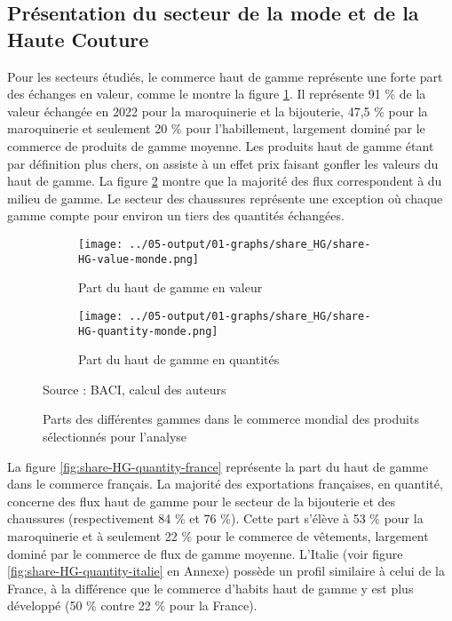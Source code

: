 \documentclass[french,10pt,a4paper]{article}
\begin{document}
\subsection{Présentation du secteur de la mode et de la Haute Couture}

Pour les secteurs étudiés, le commerce haut de gamme représente une forte part des échanges en valeur, comme le montre la figure \ref{fig:share-HG-value-monde}. Il représente 91 \% de la valeur échangée en 2022 pour la maroquinerie et la bijouterie, 47,5 \% pour la maroquinerie et seulement 20 \% pour l'habillement, largement dominé par le commerce de produits de gamme moyenne. Les produits haut de gamme étant par définition plus chers, on assiste à un effet prix faisant gonfler les valeurs du haut de gamme. La figure \ref{fig:share-HG-quantity-monde} montre que la majorité des flux correspondent à du milieu de gamme. Le secteur des chaussures représente une exception où chaque gamme compte pour environ un tiers des quantités échangées.

\begin{figure}[!h]
  \centering
  \begin{subfigure}{\textwidth}
    \centering    
    \texttt{[image: ../05-output/01-graphs/share\_HG/share-HG-value-monde.png]}
    \caption{Part du haut de gamme en valeur}
    \label{fig:share-HG-value-monde}
  \end{subfigure}
  \vspace{0.5cm}
  \begin{subfigure}{\textwidth}
    \centering
 \texttt{[image: ../05-output/01-graphs/share\_HG/share-HG-quantity-monde.png]}
 \caption{Part du haut de gamme en quantités}
 \label{fig:share-HG-quantity-monde}
\end{subfigure}
\captionsetup{justification=raggedright,singlelinecheck=false, font=small}
  \caption*{Source : BACI, calcul des auteurs}
  \captionsetup{justification=centering, singlelinecheck=true, font=normalsize}
  \caption{Parts des différentes gammes dans le commerce mondial des produits sélectionnés pour l'analyse}
  \label{fig:share-HG-value-quantity-monde}
\end{figure}

\bigskip

La figure \ref{fig:share-HG-quantity-france} représente la part du haut de gamme dans le commerce français. La majorité des exportations françaises, en quantité, concerne des flux haut de gamme pour le secteur de la bijouterie et des chaussures (respectivement 84 \% et 76 \%). Cette part s'élève à 53 \% pour la maroquinerie et à seulement 22 \% pour le commerce de vêtements, largement dominé par le commerce de flux de gamme moyenne. L'Italie (voir figure \ref{fig:share-HG-quantity-italie} en Annexe) possède un profil similaire à celui de la France, à la différence que le commerce d'habits haut de gamme y est plus développé (50 \% contre 22 \% pour la France).
\end{document}
